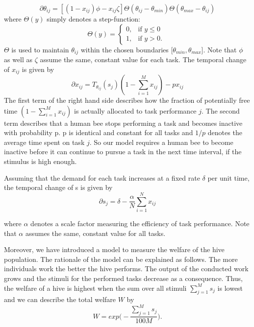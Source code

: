 \begin{equation} 
\partial \theta_{ij} = [(1-x_{ij})\phi-x_{ij}\zeta]\Theta(\theta_{ij}-\theta_{min})\Theta(\theta_{max}-\theta_{ij})
\end{equation}
where $\Theta(y)$ simply denotes a step-function:
\begin{equation}
\Theta(y) = \begin{cases}
  0,  & \text{if $y \le 0$ }\\
  1, & \text{if $y > 0.$}
\end{cases}
\end{equation}
$\Theta$ is used to maintain $\theta_{ij}$ within the chosen boundaries [$\theta_{min}, \theta_{max}$]. Note that $\phi$ as well as $\zeta$ assume the same, constant value for each task. The temporal change of $x_{ij}$ is given by
\begin{equation} 
\partial x_{ij}= T_{\theta_{ij}}(s_{j})(1-\sum \limits_{i=1}^{M}x_{ij})-px_{ij}
\end{equation} 
The first term of the right hand side describes how the fraction of potentially free time $(1-\sum \limits_{i=1}^{M}x_{ij})$ is actually allocated to task performance $j$. The second term describes that a human bee stops performing a task and becomes inactive with probability p. p is identical and constant for all tasks and $1/p$ denotes the average time spent on task $j$. So our model requires a human bee to become inactive before it can continue to pursue a task in the next time interval, if the stimulus is high enough.

Assuming that the demand for each task increases at a fixed rate $\delta$ per unit time, the temporal change of s is given by
\begin{equation}
\partial s_{j}=\delta - \frac{\alpha}{N}\sum \limits_{i=1}^{N}x_{ij}
\end{equation}

where $\alpha$ denotes a scale factor measuring the efficiency of task performance. Note that $\alpha$ assumes the same, constant value for all tasks.

Moreover, we have introduced a model to measure the welfare of the hive population. The rationale of the model can be explained as follows. The more individuals work the better the hive performs. The output of the conducted work grows and the stimuli for the performed tasks decrease as a consequence. Thus, the welfare of a hive is highest when the sum over all stimuli $\sum \limits_{j=1}^{M}s_{j}$ is lowest and we can describe the total welfare $W$ by
\begin{equation} 
W= exp\Bigg(-\frac{\sum \limits_{j=1}^{M}s_{j}}{100M}\Bigg).
\end{equation} 

